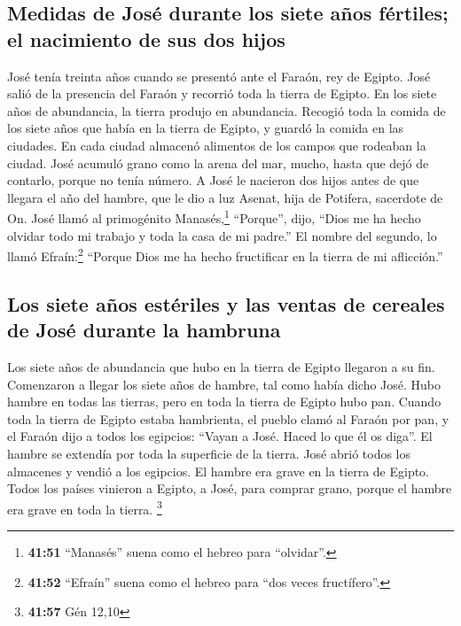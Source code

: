 \hypertarget{medidas-de-josuxe9-durante-los-siete-auxf1os-fuxe9rtiles-el-nacimiento-de-sus-dos-hijos}{%
\subsection{Medidas de José durante los siete años fértiles; el
nacimiento de sus dos
hijos}\label{medidas-de-josuxe9-durante-los-siete-auxf1os-fuxe9rtiles-el-nacimiento-de-sus-dos-hijos}}

 José tenía treinta años cuando se presentó ante el
Faraón, rey de Egipto. José salió de la presencia del Faraón y recorrió
toda la tierra de Egipto.  En los siete años de
abundancia, la tierra produjo en abundancia.  Recogió
toda la comida de los siete años que había en la tierra de Egipto, y
guardó la comida en las ciudades. En cada ciudad almacenó alimentos de
los campos que rodeaban la ciudad.  José acumuló grano
como la arena del mar, mucho, hasta que dejó de contarlo, porque no
tenía número.  A José le nacieron dos hijos antes de que
llegara el año del hambre, que le dio a luz Asenat, hija de Potifera,
sacerdote de On.  José llamó al primogénito
Manasés,\footnote{\textbf{41:51} ``Manasés'' suena como el hebreo para
  ``olvidar''.} ``Porque'', dijo, ``Dios me ha hecho olvidar todo mi
trabajo y toda la casa de mi padre.''  El nombre del
segundo, lo llamó Efraín:\footnote{\textbf{41:52} ``Efraín'' suena como
  el hebreo para ``dos veces fructífero''.} ``Porque Dios me ha hecho
fructificar en la tierra de mi aflicción.''

\hypertarget{los-siete-auxf1os-estuxe9riles-y-las-ventas-de-cereales-de-josuxe9-durante-la-hambruna}{%
\subsection{Los siete años estériles y las ventas de cereales de José
durante la
hambruna}\label{los-siete-auxf1os-estuxe9riles-y-las-ventas-de-cereales-de-josuxe9-durante-la-hambruna}}

 Los siete años de abundancia que hubo en la tierra de
Egipto llegaron a su fin.  Comenzaron a llegar los siete
años de hambre, tal como había dicho José. Hubo hambre en todas las
tierras, pero en toda la tierra de Egipto hubo pan. 
Cuando toda la tierra de Egipto estaba hambrienta, el pueblo clamó al
Faraón por pan, y el Faraón dijo a todos los egipcios: ``Vayan a José.
Haced lo que él os diga''.  El hambre se extendía por
toda la superficie de la tierra. José abrió todos los almacenes y vendió
a los egipcios. El hambre era grave en la tierra de Egipto.
 Todos los países vinieron a Egipto, a José, para comprar
grano, porque el hambre era grave en toda la tierra. \footnote{\textbf{41:57}
  Gén 12,10}

